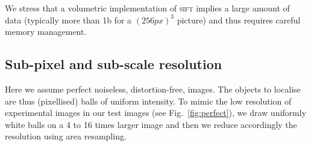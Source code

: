 \documentclass[8.5pt,twoside,twocolumn]{article}
\begin{document}
We stress that a volumetric implementation of \textsc{sift} implies a large amount of data (typically more than \unit{1}{\giga b} for a $(\unit{256}{px})^3$ picture) and thus requires careful memory management.

\subsection{Sub-pixel and sub-scale resolution}

Here we assume perfect noiseless, distortion-free, images. The objects to localise are thus (pixellised) balls of uniform intensity. To mimic the low resolution of experimental images in our test images (see Fig.~\ref{fig:perfect}), we draw uniformly white balls on a 4 to 16 times larger image and then we reduce accordingly the resolution using area resampling.
\end{document}
